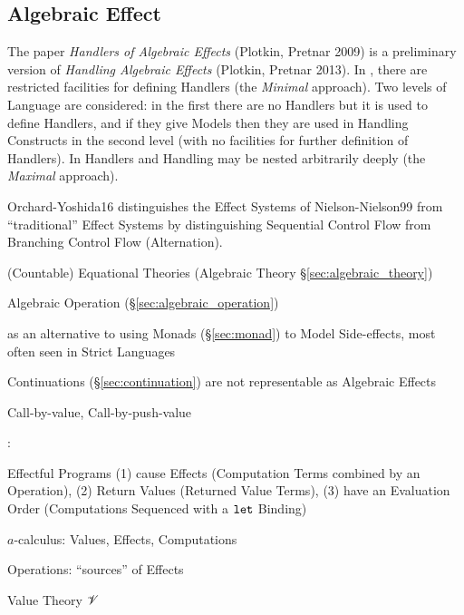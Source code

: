 \subsection{Algebraic Effect}\label{sec:algebraic_effect}

\cite{nielson-nielson99}
\cite{plotkin-pretnar09}
\cite{plotkin-pretnar13}
\cite{pretnar15}

\fist The paper \emph{Handlers of Algebraic Effects} \cite{plotkin-pretnar09}
(Plotkin, Pretnar 2009) is a preliminary version of
\emph{Handling Algebraic Effects} \cite{plotkin-pretnar13} (Plotkin, Pretnar
2013). In \cite{plotkin-pretnar09}, there are restricted facilities for defining
Handlers (the \emph{Minimal} approach). Two levels of Language are considered:
in the first there are no Handlers but it is used to define Handlers, and if
they give Models then they are used in Handling Constructs in the second level
(with no facilities for further definition of Handlers). In
\cite{plotkin-pretnar13} Handlers and Handling may be nested arbitrarily deeply
(the \emph{Maximal} approach).


\fist Orchard-Yoshida16 \cite{orchard-yoshida16} distinguishes the
Effect Systems of Nielson-Nielson99 \cite{nielson-nielson99} from
``traditional'' Effect Systems by distinguishing Sequential Control
Flow from Branching Control Flow (Alternation).


(Countable) Equational Theories (Algebraic Theory
\S\ref{sec:algebraic_theory})

Algebraic Operation (\S\ref{sec:algebraic_operation})


as an alternative to using Monads (\S\ref{sec:monad}) to Model
Side-effects, most often seen in Strict Languages

Continuations (\S\ref{sec:continuation}) are not representable as
Algebraic Effects


Call-by-value, Call-by-push-value %


\cite{plotkin-pretnar08}:

Effectful Programs (1) cause Effects (Computation Terms combined by an
Operation), (2) Return Values (Returned Value Terms), (3) have an
Evaluation Order (Computations Sequenced with a $\mathtt{let}$ Binding)

$a$-calculus: Values, Effects, Computations

Operations: ``sources'' of Effects

Value Theory $\mathscr{V}$

